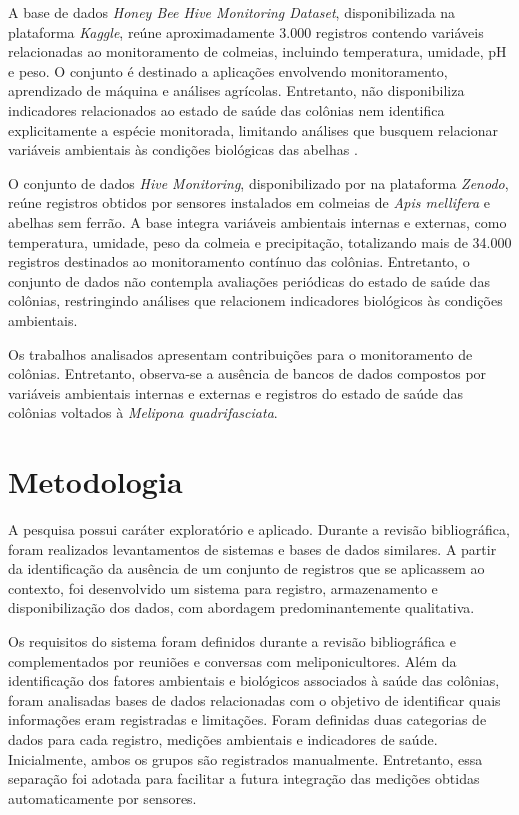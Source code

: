 \documentclass[12pt]{unisenaiclass}
\begin{document}
A base de dados \textit{Honey Bee Hive Monitoring Dataset}, disponibilizada na plataforma \textit{Kaggle}, reúne aproximadamente 3.000 registros contendo variáveis relacionadas ao monitoramento de colmeias, incluindo temperatura, umidade, pH e peso. O conjunto é destinado a aplicações envolvendo monitoramento, aprendizado de máquina e análises agrícolas. Entretanto, não disponibiliza indicadores relacionados ao estado de saúde das colônias nem identifica explicitamente a espécie monitorada, limitando análises que busquem relacionar variáveis ambientais às condições biológicas das abelhas \cite{honeybeehivemonitoringdataset}.

O conjunto de dados \textit{Hive Monitoring}, disponibilizado por \cite{jucahive2026} na plataforma \textit{Zenodo}, reúne registros obtidos por sensores instalados em colmeias de \textit{Apis mellifera} e abelhas sem ferrão. A base integra variáveis ambientais internas e externas, como temperatura, umidade, peso da colmeia e precipitação, totalizando mais de 34.000 registros destinados ao monitoramento contínuo das colônias. Entretanto, o conjunto de dados não contempla avaliações periódicas do estado de saúde das colônias, restringindo análises que relacionem indicadores biológicos às condições ambientais.

Os trabalhos analisados apresentam contribuições para o monitoramento de colônias. Entretanto, observa-se a ausência de bancos de dados compostos por variáveis ambientais internas e externas e registros do estado de saúde das colônias voltados à \textit{Melipona quadrifasciata}.

\section{Metodologia}

A pesquisa possui caráter exploratório e aplicado. Durante a revisão bibliográfica, foram realizados levantamentos de sistemas e bases de dados similares. A partir da identificação da ausência de um conjunto de registros que se aplicassem ao contexto, foi desenvolvido um sistema para registro, armazenamento e disponibilização dos dados, com abordagem predominantemente qualitativa.

Os requisitos do sistema foram definidos durante a revisão bibliográfica e complementados por reuniões e conversas com meliponicultores. Além da identificação dos fatores ambientais e biológicos associados à saúde das colônias, foram analisadas bases de dados relacionadas com o objetivo de identificar quais informações eram registradas e limitações. Foram definidas duas categorias de dados para cada registro, medições ambientais e indicadores de saúde. Inicialmente, ambos os grupos são registrados manualmente. Entretanto, essa separação foi adotada para facilitar a futura integração das medições obtidas automaticamente por sensores.
\end{document}
